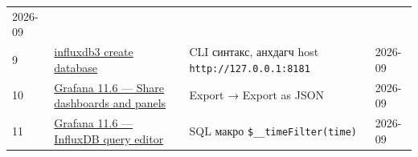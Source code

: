 \begin{longtable}[]{@{}llll@{}}
\begin{minipage}[t]{0.22\columnwidth}
2026-09\strut
\end{minipage}\tabularnewline
\begin{minipage}[t]{0.22\columnwidth}\raggedright
9\strut
\end{minipage} & \begin{minipage}[t]{0.22\columnwidth}\raggedright
\href{https://docs.influxdata.com/influxdb3/core/reference/cli/influxdb3/create/database/}{influxdb3 create database}\strut
\end{minipage} & \begin{minipage}[t]{0.22\columnwidth}\raggedright
CLI синтакс, анхдагч host \texttt{http:\allowbreak{}/\allowbreak{}/\allowbreak{}127.\allowbreak{}0.\allowbreak{}0.\allowbreak{}1:\allowbreak{}8181}\strut
\end{minipage} & \begin{minipage}[t]{0.22\columnwidth}\raggedright
2026-09\strut
\end{minipage}\tabularnewline
\begin{minipage}[t]{0.22\columnwidth}\raggedright
10\strut
\end{minipage} & \begin{minipage}[t]{0.22\columnwidth}\raggedright
\href{https://grafana.com/docs/grafana/v11.6/dashboards/share-dashboards-panels/}{Grafana 11.\allowbreak{}6 --- Share dashboards and panels}\strut
\end{minipage} & \begin{minipage}[t]{0.22\columnwidth}\raggedright
Export → Export as JSON\strut
\end{minipage} & \begin{minipage}[t]{0.22\columnwidth}\raggedright
2026-09\strut
\end{minipage}\tabularnewline
\begin{minipage}[t]{0.22\columnwidth}\raggedright
11\strut
\end{minipage} & \begin{minipage}[t]{0.22\columnwidth}\raggedright
\href{https://grafana.com/docs/grafana/v11.6/datasources/influxdb/query-editor/}{Grafana 11.\allowbreak{}6 --- InfluxDB query editor}\strut
\end{minipage} & \begin{minipage}[t]{0.22\columnwidth}\raggedright
SQL макро \texttt{\$\_\allowbreak{}\_\allowbreak{}timeFilter(time)}\strut
\end{minipage} & \begin{minipage}[t]{0.22\columnwidth}\raggedright
2026-09\strut
\end{minipage}\tabularnewline

\end{longtable}
